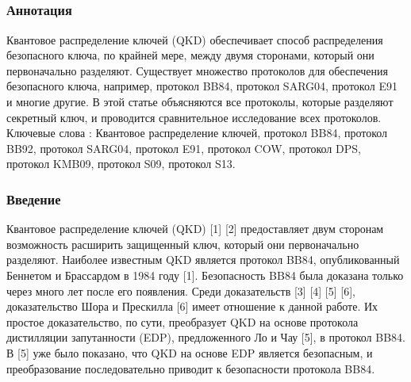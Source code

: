 \subsection{\trnas}
\subsubsection*{Аннотация}

Квантовое распределение ключей (QKD) обеспечивает способ распределения безопасного ключа, по крайней мере, между двумя сторонами, который они первоначально разделяют. Существует множество протоколов для обеспечения безопасного ключа, например, протокол BB84, протокол SARG04, протокол E91 и многие другие. В этой статье объясняются все протоколы, которые разделяют секретный ключ, и проводится сравнительное исследование всех протоколов.
Ключевые слова : Квантовое распределение ключей, протокол BB84, протокол BB92, протокол SARG04, протокол E91, протокол COW, протокол DPS, протокол KMB09, протокол S09, протокол S13.

\subsubsection{Введение}

Квантовое распределение ключей (QKD) [1] [2] предоставляет двум сторонам возможность расширить защищенный ключ, который они первоначально разделяют. Наиболее известным QKD является протокол BB84, опубликованный Беннетом и Брассардом в 1984 году [1]. Безопасность BB84 была доказана только через много лет после его появления. Среди доказательств [3] [4] [5] [6], доказательство Шора и Прескилла [6] имеет отношение к данной работе. Их простое доказательство, по сути, преобразует QKD на основе протокола дистилляции запутанности (EDP), предложенного Ло и Чау [5], в протокол BB84. В [5] уже было показано, что QKD на основе EDP является безопасным, и преобразование последовательно приводит к безопасности протокола BB84.

